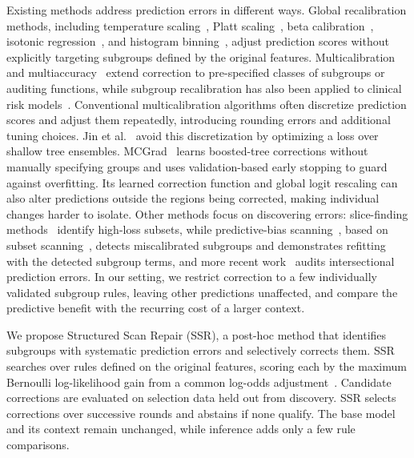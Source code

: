 \documentclass[conference]{IEEEtran}
\begin{document}
Existing methods address prediction errors in different ways. Global recalibration methods, including
temperature scaling~\cite{guo2017calibration}, Platt scaling~\cite{platt1999}, beta
calibration~\cite{kull2017beta}, isotonic regression~\cite{zadrozny2002}, and histogram
binning~\cite{zadrozny2001}, adjust prediction scores without explicitly targeting subgroups defined
by the original features. Multicalibration~\cite{hebert2018multicalibration} and
multiaccuracy~\cite{kim2019multiaccuracy} extend correction to pre-specified classes of subgroups or
auditing functions, while subgroup recalibration has also been applied to clinical risk
models~\cite{barda2021subpopulation}. Conventional multicalibration algorithms often discretize
prediction scores and adjust them repeatedly, introducing rounding errors and additional tuning
choices. Jin et al.~\cite{jin2025discretization} avoid this discretization by optimizing a loss over
shallow tree ensembles. MCGrad~\cite{tax2026mcgrad} learns boosted-tree corrections without manually
specifying groups and uses validation-based early stopping to guard against overfitting. Its learned
correction function and global logit rescaling can also alter predictions outside the regions being
corrected, making individual changes harder to isolate. Other methods focus on discovering errors:
slice-finding methods~\cite{chung2019slicefinder,sagadeeva2021sliceline} identify high-loss subsets,
while predictive-bias scanning~\cite{zhang2016bias}, based on subset scanning~\cite{neill2012fast},
detects miscalibrated subgroups and demonstrates refitting with the detected subgroup terms, and
more recent work~\cite{boxer2026intersectional} audits intersectional prediction errors. In our setting,
we restrict correction to a few individually validated subgroup rules, leaving other predictions
unaffected, and compare the predictive benefit with the recurring cost of a larger context.

We propose Structured Scan Repair (SSR), a post-hoc method that identifies subgroups with systematic
prediction errors and selectively corrects them. SSR searches over rules defined on the original
features, scoring each by the maximum Bernoulli log-likelihood gain from a common log-odds
adjustment~\cite{zhang2016bias}. Candidate corrections are evaluated on selection data held out from
discovery. SSR selects corrections over successive rounds and abstains if none qualify. The
base model and its context remain unchanged, while inference adds only a few rule comparisons.
\end{document}

